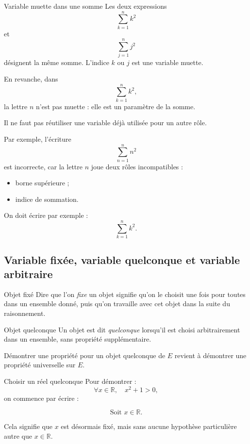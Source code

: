 \documentclass[11pt,a4paper]{article}
\begin{document}
\begin{exemplebox}{Variable muette dans une somme}{}
Les deux expressions
\[
\sum_{k=1}^{n} k^2
\]
et
\[
\sum_{j=1}^{n} j^2
\]
désignent la même somme. L'indice $k$ ou $j$ est une variable muette.

En revanche, dans
\[
\sum_{k=1}^{n} k^2,
\]
la lettre $n$ n'est pas muette : elle est un paramètre de la somme.
\end{exemplebox}

\begin{erreurbox}
Il ne faut pas réutiliser une variable déjà utilisée pour un autre rôle.

Par exemple, l'écriture
\[
\sum_{n=1}^{n} n^2
\]
est incorrecte, car la lettre $n$ joue deux rôles incompatibles :
\begin{itemize}
    \item borne supérieure ;
    \item indice de sommation.
\end{itemize}

On doit écrire par exemple :
\[
\sum_{k=1}^{n} k^2.
\]
\end{erreurbox}

\subsection{Variable fixée, variable quelconque et variable arbitraire}

\begin{definitionbox}{Objet fixé}{}
Dire que l'on \emph{fixe} un objet signifie qu'on le choisit une fois pour toutes dans un ensemble donné, puis qu'on travaille avec cet objet dans la suite du raisonnement.
\end{definitionbox}

\begin{definitionbox}{Objet quelconque}{}
Un objet est dit \emph{quelconque} lorsqu'il est choisi arbitrairement dans un ensemble, sans propriété supplémentaire.

Démontrer une propriété pour un objet quelconque de $E$ revient à démontrer une propriété universelle sur $E$.
\end{definitionbox}

\begin{exemplebox}{Choisir un réel quelconque}{}
Pour démontrer :
\[
\forall x\in\mathbb{R},\quad x^2+1>0,
\]
on commence par écrire :

\[
\text{Soit } x\in\mathbb{R}.
\]

Cela signifie que $x$ est désormais fixé, mais sans aucune hypothèse particulière autre que $x\in\mathbb{R}$.
\end{exemplebox}
\end{document}
